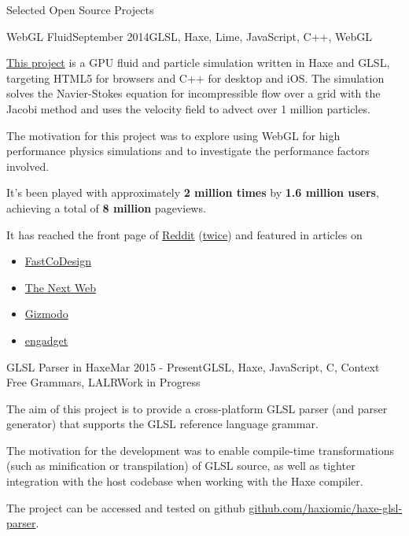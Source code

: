 \documentclass{resume} %
\begin{document}
\begin{rSection}{Selected Open Source Projects}

\begin{rSubsection}{WebGL Fluid}{September 2014}{GLSL, Haxe, Lime, JavaScript, C++, WebGL}{}
\item \href{https://github.com/haxiomic/GPU-Fluid-Experiments}{This project} is a GPU fluid and particle simulation written in Haxe and GLSL, targeting HTML5 for browsers and C++ for desktop and iOS. The simulation solves the Navier-Stokes equation for incompressible flow over a grid with the Jacobi method and uses the velocity field to advect over 1 million particles.
\item The motivation for this project was to explore using WebGL for high performance physics simulations and to investigate the performance factors involved.
\item It's been played with approximately \textbf{2 million times} by \textbf{1.6 million users}, achieving a total of \textbf{8 million} pageviews.
\item It has reached the front page of \href{https://www.reddit.com/r/InternetIsBeautiful/comments/2gkunq/fluid_and_particles_in_webgl/}{Reddit} (\href{https://www.reddit.com/r/InternetIsBeautiful/comments/35s6hg/in_browser_physics_simulator_xpost_pc_master_race/}{twice}) and featured in articles on
\begin{itemize}
	\item \href{http://www.fastcodesign.com/3038725/this-wonderful-web-toy-turns-your-browser-into-magic-liquid}{FastCoDesign}
	\item \href{http://thenextweb.com/creativity/2015/05/15/webgl-fluid-experiment-is-a-browser-based-lsd-trip/}{The Next Web}
	\item \href{http://www.gizmodo.co.uk/2014/11/just-try-and-stop-playing-with-this-fluid-simulator/}{Gizmodo}
	\item \href{http://www.engadget.com/2015/05/15/GPU-physics-trippy-simulation/}{engadget}
\end{itemize}
\end{rSubsection}

\begin{rSubsection}{GLSL Parser in Haxe}{Mar 2015 - Present}{GLSL, Haxe, JavaScript, C, Context Free Grammars, LALR}{Work in Progress}
\item The aim of this project is to provide a cross-platform GLSL parser (and parser generator) that supports the GLSL reference language grammar.
\item The motivation for the development was to enable compile-time transformations (such as minification or transpilation) of GLSL source, as well as tighter integration with the host codebase when working with the Haxe compiler.
\item The project can be accessed and tested on github \href{https://github.com/haxiomic/haxe-glsl-parser}{github.com/haxiomic/haxe-glsl-parser}.
\end{rSubsection}
	
\end{rSection}
\end{document}
